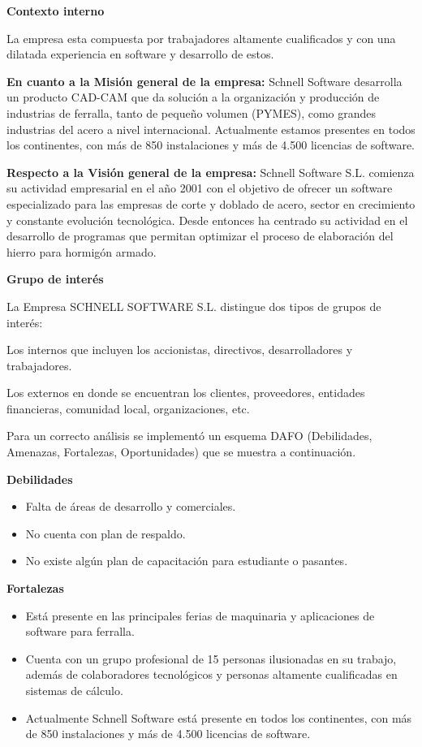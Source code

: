 \documentclass[10pt,a4paper]{article}
\begin{document}
\begin{enumerate}
\textbf{Contexto interno}

La empresa esta compuesta por trabajadores altamente cualificados y con una dilatada experiencia en software y desarrollo de estos.

\textbf{En cuanto a la Misión general de la empresa: }Schnell Software desarrolla un producto CAD-CAM que da solución a la organización y producción de industrias de ferralla, tanto de pequeño volumen (PYMES), como grandes industrias del acero a nivel internacional. Actualmente estamos presentes en todos los continentes, con más de 850 instalaciones y más de 4.500 licencias de software.

\textbf{Respecto a la Visión general de la empresa: }Schnell Software S.L. comienza su actividad empresarial en el año 2001 con el objetivo de ofrecer un software especializado para las empresas de corte y doblado de acero, sector en crecimiento y constante evolución tecnológica. Desde entonces ha centrado su actividad en el desarrollo de programas que permitan optimizar el proceso de elaboración del hierro para hormigón armado.

\textbf{Grupo de interés}

La Empresa SCHNELL SOFTWARE S.L. distingue dos tipos de grupos de interés:

Los internos que incluyen los accionistas, directivos, desarrolladores y trabajadores.

Los externos en donde se encuentran los clientes, proveedores, entidades financieras, comunidad local, organizaciones, etc.

Para un correcto análisis se implementó un esquema DAFO (Debilidades, Amenazas, Fortalezas, Oportunidades) que se muestra a continuación.

\textbf{Debilidades}

\begin{itemize}
\item Falta de áreas de desarrollo y comerciales.
\item No cuenta con plan de respaldo.
\item No existe algún plan de capacitación para estudiante o pasantes.
\end{itemize}

\textbf{Fortalezas}

\begin{itemize}
\item Está presente en las principales ferias de maquinaria y aplicaciones de software para ferralla.
\item Cuenta con un grupo profesional de 15 personas ilusionadas en su trabajo, además de colaboradores tecnológicos y personas altamente cualificadas en sistemas de cálculo.
\item Actualmente Schnell Software está presente en todos los continentes, con más de 850 instalaciones y más de 4.500 licencias de software.
\end{itemize}


\end{enumerate}
\end{document}
